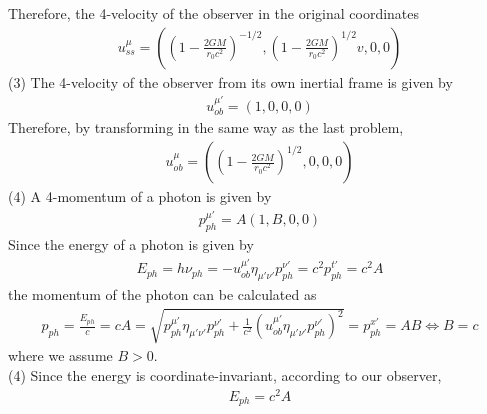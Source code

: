 \documentclass[12pt]{article}
\begin{document}
Therefore, the 4-velocity of the observer in the original coordinates
\begin{align*}
u_{ss}^{\mu} = \left(\left(1 - \frac{2 G M}{r_0 c^2} \right)^{-1/2}, \left(1 - \frac{2 G M}{r_0 c^2} \right)^{1/2} v, 0, 0\right)
\end{align*}
(3) The 4-velocity of the observer from its own inertial frame is given by
\begin{gather*}
u_{ob}^{\mu'} = \left(1, 0, 0, 0\right)
\end{gather*}
Therefore, by transforming in the same way as the last problem,
\begin{gather*}
u_{ob}^{\mu} = \left(\left(1 - \frac{2 G M}{r_0 c^2} \right)^{1/2}, 0, 0, 0\right)
\end{gather*}
(4) A 4-momentum of a photon is given by
\begin{gather*}
p_{ph}^{\mu'} = A \left(1, B, 0, 0\right)
\end{gather*}
Since the energy of a photon is given by
\begin{gather*}
E_{ph} = h \nu_{ph} = - u_{ob}^{\mu'} \eta_{\mu' \nu'} p_{ph}^{\nu'} = c^2 p_{ph}^{t'} = c^2 A
\end{gather*}
the momentum of the photon can be calculated as
\begin{gather*}
p_{ph} = \frac{E_{ph}}{c} = c A = \sqrt{p_{ph}^{\mu'} \eta_{\mu' \nu'} p_{ph}^{\nu'} + \frac{1}{c^2} \left(u_{ob}^{\mu'} \eta_{\mu' \nu'} p_{ph}^{\nu'}\right)^2}  = p_{ph}^{x'}= A B \Leftrightarrow B = c
\end{gather*}
where we assume $B > 0$.\\
(4) Since the energy is coordinate-invariant, according to our observer,
\begin{gather*}
E_{ph} = c^2 A
\end{gather*}
\end{document}
